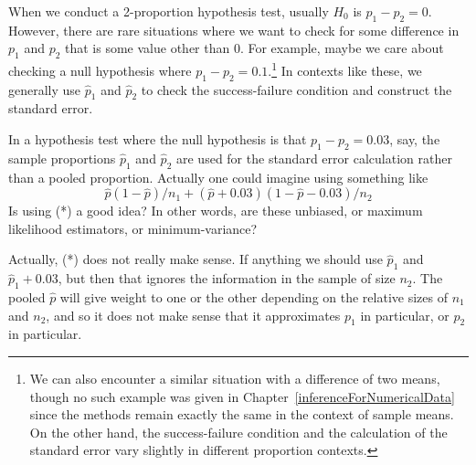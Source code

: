When we conduct a 2-proportion hypothesis test, usually $H_0$ is $p_1 - p_2 = 0$. However, there are rare situations where we want to check for some difference in $p_1$ and $p_2$ that is some value other than 0. For example, maybe we care about checking a null hypothesis where $p_1 - p_2 = 0.1$.\footnote{We can also encounter a similar situation with a difference of two means, though no such example was given in Chapter~\ref{inferenceForNumericalData} since the methods remain exactly the same in the context of sample means. On the other hand, the success-failure condition and the calculation of the standard error vary slightly in different proportion contexts.} In contexts like these, we generally use $\hat{p}_1$ and $\hat{p}_2$ to check the success-failure condition and construct the standard error.




In a hypothesis test where the null hypothesis is that $p_1 - p_2 = 0.03$, say, the sample proportions $\hat p_1$ and $\hat p_2$ are used for the standard error calculation rather than a pooled proportion. Actually one could imagine using something like
\[
	\hat p(1-\hat p)/n_1 + (\hat p+0.03)(1-\hat p-0.03)/n_2\tag{*}
\]
Is using (*) a good idea?
In other words, are these unbiased, or maximum likelihood estimators, or minimum-variance?

Actually, (*) does not really make sense. If anything we should use $\hat p_1$ and $\hat p_1+0.03$, but then that ignores the information in the sample of size $n_2$.
The pooled $\hat p$ will give weight to one or the other depending on the relative sizes of $n_1$ and $n_2$, and so it does not make sense that it approximates $p_1$ in particular, or $p_2$ in particular.

